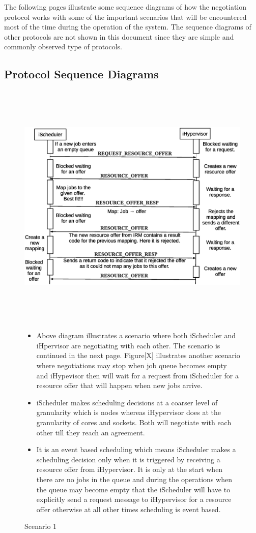 \documentclass[a4paper, 12pt]{article}
\begin{document}
\noindent
The following pages illustrate some sequence diagrams of how the negotiation protocol works with some of the important scenarios that will be encountered most of the time during the operation of the system. The sequence diagrams of other protocols are not shown in this document since they are simple and commonly observed type of protocols.
\clearpage
\subsection{Protocol Sequence Diagrams}
\vspace{-0.15in}
\begin{figure}[!htbp]
\centering
\includegraphics[width=1.0\textwidth, height=120mm]{./figures.eps}
\caption{Scenario 1}
\begin{itemize}
\item Above diagram illustrates a scenario where both iScheduler and iHpervisor are negotiating with each other. The scenario is continued in the next page. Figure[X] illustrates another scenario where negotiations may stop when job queue becomes empty and iHypevisor then will wait for a request from iScheduler for a resource offer that will happen when new jobs arrive.
\item iScheduler makes scheduling decisions at a coarser level of granularity which is nodes whereas iHypervisor does at the granularity of cores and sockets. Both will negotiate with each other till they reach an agreement.
\item It is an event based scheduling which means iScheduler makes a scheduling decision only when it is triggered by receiving a resource offer from iHypervisor. It is only at the start when there are no jobs in the queue and during the operations when the queue may become empty that the iScheduler will have to explicitly send a request message to iHypervisor for a resource offer otherwise at all other times scheduling is event based.
\end{itemize}
\label{fig:Seq1}
\end{figure}
\end{document}
